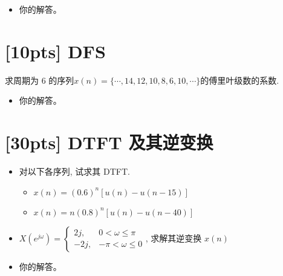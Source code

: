 \documentclass[a4paper,UTF8]{article}
\numberwithin{equation}{section}
\begin{document}
	\begin{framed}
		\begin{spacing}{1.5}
			\begin{itemize}
				\item 你的解答。
			\end{itemize}
		\end{spacing}
	\end{framed}
	
	\newpage
	\section{[10pts] DFS}
	求周期为 6 的序列$ x(n)=\{\cdots, 14, 12, 10, 8, 6, 10, \cdots\} $的傅里叶级数的系数.
	
	\begin{framed}
		\begin{spacing}{1.5}
			\begin{itemize}
				\item 你的解答。
			\end{itemize}
		\end{spacing}
	\end{framed}
	
	\newpage
	\section{[30pts] DTFT 及其逆变换}
	\begin{itemize}
		\item[1.] 对以下各序列, 试求其 DTFT.
		\begin{itemize}
			\item[(1)] $x(n)=(0.6)^n[u(n)-u(n-15)]$
			\item[(2)] $x(n)=n(0.8)^n[u(n)-u(n-40)]$
		\end{itemize}
		\item[2.] $ X(e^{j\omega})= \begin{cases}2j, & 0<\omega \leqslant \pi \\ -2j, & -\pi<\omega \leqslant 0\end{cases} $, 求解其逆变换 $ x(n) $
	\end{itemize}
	
	\begin{framed}
		\begin{spacing}{1.5}
			\begin{itemize}
				\item 你的解答。
			\end{itemize}
		\end{spacing}
	\end{framed}
	
\end{document}
